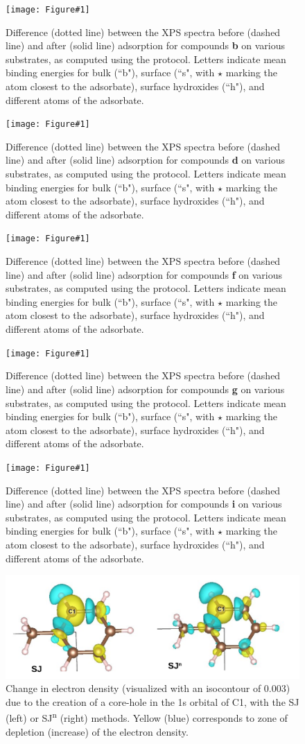 \documentclass[%
aip,
amsmath,amssymb,
preprint,%
]{revtex4-2}
\begin{document}
\newcommand{\XPSsa}[2]{
	\begin{turnpage}
\begin{figure}[!h]
	\centering
	\texttt{[image: Figure\#1]}
	\caption{Difference (dotted line) between the XPS spectra before (dashed line) and after (solid line) adsorption for compounds \textbf{#2} on various substrates, as computed using the \cpx{E_\infty} protocol. Letters indicate mean binding energies for bulk (``b"), surface (``s", with $\star$ marking the atom closest to the adsorbate), surface hydroxides (``h"), and different atoms of the adsorbate.}
	\label{fig:spectraXPSads#2}
\end{figure}
\end{turnpage}
}

\XPSsa{S5}{b}
\XPSsa{S6}{d}
\XPSsa{S7}{f}
\XPSsa{S8}{g}
\XPSsa{S9}{i}

\begin{figure}[!h]
	\includegraphics[width=\linewidth]{FigureS10}
	\caption{Change in electron density (visualized with an isocontour of 0.003) due to the creation of a core-hole in the 1s orbital of C1, with the SJ (left) or SJ\textsuperscript{n} (right) methods. Yellow (blue) corresponds to zone of depletion (increase) of the electron density.}
\end{figure}

\clearpage

	
\end{document}
